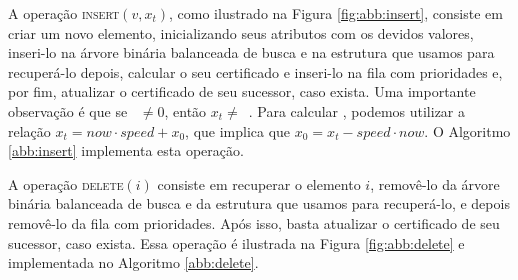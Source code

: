 A operação \textsc{insert}$(v, x_t)$, como ilustrado na Figura
\ref{fig:abb:insert}, consiste em criar um novo elemento,
inicializando seus atributos com os devidos valores, inseri-lo na
árvore binária balanceada de busca e na estrutura que usamos para
recuperá-lo depois, calcular o seu certificado e inseri-lo na fila
com prioridades e, por fim, atualizar o certificado de seu sucessor,
caso exista. Uma importante observação é que se \now~$\neq 0$, então
$x_t \neq$~\initv. Para calcular \initv, podemos utilizar a relação
${x_t = now\cdot speed + x_0}$, que implica que ${x_0 = x_t -
speed\cdot now}$. O Algoritmo \ref{abb:insert} implementa esta
operação.





A operação \textsc{delete}$(i)$ consiste em recuperar o elemento
$i$, removê-lo da árvore binária balanceada de busca e da estrutura
que usamos para recuperá-lo, e depois removê-lo da fila com
prioridades. Após isso, basta atualizar o certificado de seu
sucessor, caso exista. Essa operação é ilustrada na Figura
\ref{fig:abb:delete} e implementada no Algoritmo \ref{abb:delete}.


